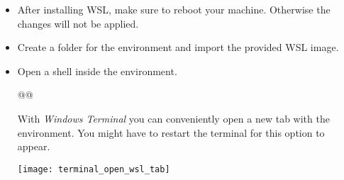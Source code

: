 \begin{itemize}
  \item After installing WSL, make sure to reboot your machine.
    Otherwise the changes will not be applied.

  \item Create a folder for the environment and import the provided WSL image.

  \item Open a shell inside the environment.

        \begin{monobox}
@\cmdinwsl{}@
\end{monobox}
    \begin{infobox}
      With \emph{Windows Terminal} you can conveniently open a new tab with the environment.
      You might have to restart the terminal for this option to appear.
      \begin{center}
        \texttt{[image: terminal\_open\_wsl\_tab]}
      \end{center}
    \end{infobox}
\end{itemize}
